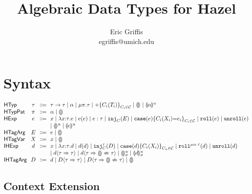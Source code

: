 \documentclass{article}
\title{Algebraic Data Types for Hazel}
\author{Eric Griffis \\ egriffis@umich.edu}
\date{}
\let\originalleft\left
\let\originalright\right
\renewcommand{\left}{\mathopen{}\mathclose\bgroup\originalleft}
\renewcommand{\right}{\aftergroup\egroup\originalright}
\newcommand\Sort[1]{\mathsf{#1}}
\newcommand\IHExp{\Sort{IHExp}}
\newcommand\IHTagArg{\Sort{IHTagArg}}
\newcommand\HExp{\Sort{HExp}}
\newcommand\HTagArg{\Sort{HTagArg}}
\newcommand\HTagVar{\Sort{HTagVar}}
\newcommand\HTyp{\Sort{HTyp}}
\newcommand\HTypPat{\Sort{HTypPat}}
\newcommand\hole[2][]{\llparenthesis#1\rrparenthesis^{#2}}
\newcommand\Dhole[3][]{\llparenthesis#1\rrparenthesis_{#2}^{#3}}
\newcommand\Tarrow[2]{#1 \rightarrow #2}
\newcommand\Trec[2]{\mu{#1}.{#2}}
\newcommand\Tsum[1]{+\mathopen{}\left\{#1\right\}}
\newcommand\TagSet{\mathcal{C}}
\newcommand\literal[1]{\mathtt{#1}}
\newcommand\asc[2]{{#1}:{#2}}
\newcommand\Efun[3]{\lambda{#1}{:}{#2}.{#3}}
\newcommand\Eapp[2]{{#1}\left({#2}\right)}
\newcommand\Einj[2]{\literal{inj}_{#1}\left({#2}\right)}
\newcommand\Ecase[2]{\literal{case} \left({#1}\right) \left\{{#2}\right\}}
\newcommand\Eroll[1]{\literal{roll}\left(#1\right)}
\newcommand\Eunroll[1]{\literal{unroll}\left(#1\right)}
\newcommand\Dfun[3]{\lambda{#1}{:}{#2}.{#3}}
\newcommand\Dapp[2]{{#1}\left({#2}\right)}
\newcommand\Dinj[3]{\literal{inj}_{#1}^{#2}\left({#3}\right)}
\newcommand\Dcase[2]{\literal{case} \left({#1}\right) \left\{{#2}\right\}}
\newcommand\Droll[3]{\literal{roll}^{\Trec{#1}{#2}}\left({#3}\right)}
\newcommand\Dunroll[1]{\literal{unroll}\left(#1\right)}
\newcommand\cast[3]{{#1}\langle{#2}\Rightarrow{#3}\rangle}
\newcommand\castfail[3]{{#1}\langle{#2}\Rightarrow{\llparenthesis\rrparenthesis}\nRightarrow{#3}\rangle}
\begin{document}
\maketitle


\section{Syntax}

\[
  \arraycolsep=0pt
  \begin{array}{l@{~~}c@{~~}c@{~~}l}
    \HTyp & \tau & \Coloneqq &
      \Tarrow{\tau}{\tau}
      \mid \alpha
      \mid \Trec{\pi}{\tau}
      \mid \Tsum{C_i(T_i)}_{C_i \in \TagSet}
      \mid \hole{}
      \mid \hole[\alpha]{u}
      \\
    \HTypPat & \pi & \Coloneqq & \alpha \mid \hole{} \\
    \HExp & e & \Coloneqq &
      x
      \mid \Efun{x}{\tau}{e}
      \mid \Eapp{e}{e}
      \mid \asc{e}{\tau}
      \mid \Einj{C}{E}
      \mid \Ecase{e}{C_i(X_i){=}e_i}_{C_i \in \TagSet}
      \mid \Eroll{e}
      \mid \Eunroll{e}
      \\ & & &
      \mid \hole{u}
      \mid \hole[e]{u}
      \\
    \HTagArg & E & \Coloneqq & e \mid \hole{} \\
    \HTagVar & X & \Coloneqq & x \mid \hole{} \\
    \IHExp & d & \Coloneqq &
      x
      \mid \Dfun{x}{\tau}{d}
      \mid \Dapp{d}{d}
      \mid \Dinj{C}{\tau}{D}
      \mid \Dcase{d}{C_i(X_i)}_{C_u \in \TagSet}
      \mid \Droll{\alpha}{\tau}{d}
      \mid \Dunroll{d}
      \\ & & &
      \mid \cast{d}{\tau}{\tau}
      \mid \castfail{d}{\tau}{\tau}
      \mid \Dhole{\sigma}{u}
      \mid \Dhole[d]{\sigma}{u}
      \\
    \IHTagArg & D & \Coloneqq &
      d
      \mid \cast{D}{\tau}{\tau}
      \mid \castfail{D}{\tau}{\tau}
      \mid \hole{}
      \\
  \end{array}
\]


\subsection{Context Extension}
\end{document}
